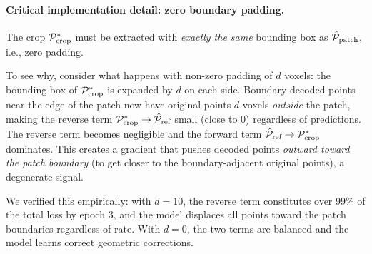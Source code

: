 \paragraph{Critical implementation detail: zero boundary padding.}
The crop $\mathcal{P}^*_{\text{crop}}$ must be extracted with \emph{exactly the same}
bounding box as $\hat{\mathcal{P}}_{\text{patch}}$, i.e., zero padding.

To see why, consider what happens with non-zero padding of $d$ voxels:
the bounding box of $\mathcal{P}^*_{\text{crop}}$ is expanded by $d$ on each side.
Boundary decoded points near the edge of the patch now have original points
$d$ voxels \emph{outside} the patch, making the reverse term
$\mathcal{P}^*_{\text{crop}} \to \hat{\mathcal{P}}_{\text{ref}}$ small (close to 0) regardless
of predictions.
The reverse term becomes negligible and the forward term
$\hat{\mathcal{P}}_{\text{ref}} \to \mathcal{P}^*_{\text{crop}}$ dominates.
This creates a gradient that pushes decoded points \emph{outward toward the
patch boundary} (to get closer to the boundary-adjacent original points),
a degenerate signal.

We verified this empirically: with $d = 10$, the reverse term constitutes
over 99\% of the total loss by epoch 3, and the model displaces all points
toward the patch boundaries regardless of rate.
With $d = 0$, the two terms are balanced and the model learns correct
geometric corrections.


